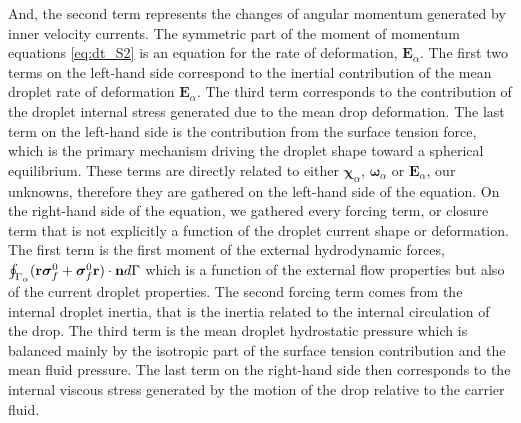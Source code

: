 And, the second term represents the changes of angular momentum generated by inner velocity currents. 
The symmetric part of the moment of momentum equations \ref{eq:dt_S2} is an equation for the rate of deformation, $\textbf{E}_\alpha$. 
The first two terms on the left-hand side correspond to the inertial contribution of the mean droplet rate of deformation $\textbf{E}_\alpha$. 
The third term corresponds to the contribution of the droplet internal stress generated due to the mean drop deformation. 
The last term on the left-hand side is the contribution from the surface tension force, which is the primary mechanism driving the droplet shape toward a spherical equilibrium. 
These terms are directly related to either $\bm\chi_\alpha$, $\bm\omega_\alpha$ or $\textbf{E}_\alpha$, our unknowns, therefore they are gathered on the left-hand side of the equation. 
On the right-hand side of the equation, we gathered every forcing term, or closure term that is not explicitly a function of the droplet current shape or deformation.  
The first term is the first moment of the external hydrodynamic forces, $\oint_{\Gamma_{\alpha}} (\textbf{r}\bm\sigma_f^0+ \bm\sigma_f^0\textbf{r})\cdot \textbf{n} d\Gamma$ which is a function of the external flow properties but also of the current droplet properties. 
The second forcing term comes from the internal droplet inertia, that is the inertia related to the internal circulation of the drop. 
The third term is the mean droplet hydrostatic pressure which is balanced mainly by the isotropic part of the surface tension contribution and the mean fluid pressure. 
The last term on the right-hand side then corresponds to the internal viscous stress generated by the motion of the drop relative to the carrier fluid. 


